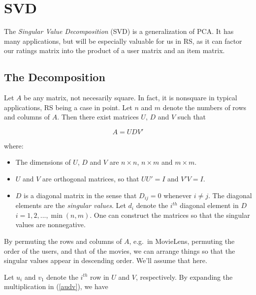 \section{SVD}

The \textit{Singular Value Decomposition} (SVD) is a generalization 
of PCA.  It has many applications, but will be especially valuable for
us in RS, as it can factor our ratings matrix into the product of a user
matrix and an item matrix.

\subsection{The Decomposition}

Let $A$ be any matrix, not necesarily square.  In fact, it is nonsquare
in typical applications, RS being a case in point.  Let $n$ and $m$
denote the numbers of rows and columns of $A$.
Then there exist matrices $U$, $D$ and $V$ such that

\begin{equation}
\label{audv}
A = U D V'
\end{equation}

where:

\begin{itemize}

\item The dimensions of $U$, $D$ and $V$ are $n \times n$, $n \times m$
and $m \times m$.

\item $U$ and $V$ are orthogonal matrices, so that $U U' = I$ and $V'V =
I$.

\item $D$ is a diagonal matrix in the sense that $D_{ij} = 0$ whenever
$i \neq j$.  The diagonal elements are the \textit{singular values}.
Let $d_{i}$ denote the $i^{th}$ diagonal element in $D$
$i = 1,2,...,\min(n,m)$.  One can construct the matrices so that the
singular values are nonnegative.

\end{itemize} 

By permuting the rows and columns of $A$, e.g.\ in MovieLens, permuting
the order of the users, and that of the movies, we can arrange things so
that the singular values appear in descending order.  We'll assume that
here.

Let $u_i$ and $v_1$ denote the $i^{th}$ row in $U$ and $V$, 
respectively.  By expanding the multiplication in (\ref{audv}), we have

